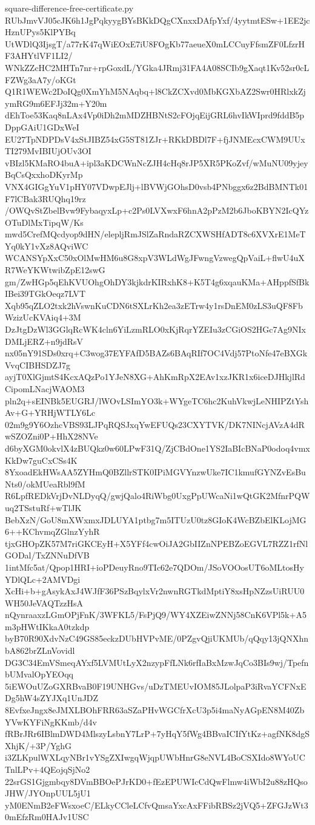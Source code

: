 \documentclass[11pt]{article}
\theoremstyle{definition}
\theoremstyle{remark}
\begin{document}
\begin{filecontents*}[overwrite]{square-difference-free-certificate.py}
RUbJmvVJ05cJK6h1JgPqkyygBYsBKkDQgCXnxxDAfpYxf/4yytmtESw+1EE2jcHznUPys5KlPYBq
UtWDlQ3IjsgT/a77rK47qWiEOxE7iU8FOgKb77aeueX0mLCCuyFfsmZF0LfzrHF3AHYtlVF1LI2/
WNkZZcHC2MHTn7nr+rpGoxdL/YGka4JRmj31FA4A08SCIb9gXaqt1Kv52sr0cLFZWg3aA7y/oKGt
Q1R1WEWc2DoIQg0XmYhM5NAqbq+l8CkZCXvd0MbKGXbAZ2Swr0HRlxkZjymRG9m6EFJj32m+Y20m
dEhToe53Kaq8nLAx4Vp0iDh2mMDZHBNtS2cFOjqEijGRL6hvIkWIprd9fddB5pDppGAiU1GDxWeI
EU27TpNDPDsV4xStJIBZ54xG5ST81ZJr+RKkDBDl7F+fjJNMEcxCWM9UUxTI279MvIBIUjOUv3OI
vBIzl5KMaRO4buA+ipl3aKDCWnNcZJH4cHq8rJP5XR5PKoZvf/wMuNU09yjeyBqCsQxxhoDKyrMp
VNX4GIGgYuV1pHY07VDwpEJlj+lBVWjGOhsD0vsb4PNbggx6z2BdBMNTk01F7lCBak3RUQhq19rz
/OWQvStZbelBvw9FybaqyxLp+c2Ps0LVXwxF6hnA2pPzM2b6JboKBYN2IcQYzOTuDlMxTipqW/Ks
mwd5CrefMQcdyop9dHN/elepljRmJSlZaRndaRZCXWSHfADT8c6XVXrE1MeTYq0kY1vXz8AQviWC
WCANSYpXxC50xOlMwHM6u8G8xpV3WLdWgJFwngVzwegQpVaiL+flwU4uXR7WeYKWtwibZpE12swG
gm/ZwHGp5qEhKVUOhgOhDY3kjkdrKIRxhK8+K5T4g6xqauKMa+AHppfSfBkIBei39TGkOeqz7LVT
Xqb95qZLO2txk2hVswnKuCDN6tSXLrKh2ea3zETrw4y1rsDnEM0zLS3uQF8FbWzizUcKVAiq4+3M
DzJtgDzWl3GGlqRcWK4cln6YiLzmRLO0xKjRqrYZEIu3zCGiOS2HGc7Ag9NIxDMLjERZ+n9jdRsV
nx05nY91SDs0xrq+C3wog37EYFAfD5BAZs6BAqRIf7OC4Vdj57PtoNfe47eBXGkVvqCIBHSDZJ7g
ayjT0XlGjmtS4KcxAQzPo1YJeN8XG+AhKmRpX2EAv1xzJKR1x6iceDJHkjlRdCipomLNacjWAOM3
pln2q+sEINBk5EUGRJ/lWOvLSImYO3k+WYgeTC6hc2KuhVkwjLeNHIPZtYshAv+G+YRHjWTLY6Lc
02m9g9Y6OzhcVBS93LJPqRQSJxqYwEFUQs23CXYTVK/DK7NINcjAVzA4dRwSZOZni0P+HhX28NVe
d6byXGM0okvlX4zBUQkz0w60LPwF31Q/ZjCBdOne1YS2IaBIcBNaP0odoq4vmxKkDw7guCxCSs4K
8YxoadEkHWsAA5ZYHmQ0BZllrSTK0IPiMGVYnzwUke7IC1kmufGYNZvEsBuNts0/okMUeaRbl9fM
R6LpfREDkVrjDvNLDyqQ/gwjQalo4RiWbg0UxgPpUWcaNi1wQtGK2MfnrPQWuq2TSstuRf+wTlJK
BebXzN/GoU8mXWxmxJDLUYA1ptbg7m5ITUzU0tz8GIoK4WcBZbElKLojMG6++KChvmqZGlnzYyhR
tjxGHOpZK57M7riGKCEyH+X5YFf4cwOiJA2GbIIZnNPEBZoEGVL7RZZ1rfNlGODal/TxZNNuDfVB
1intMfc5at/Qpop1HRI+ioPDeuyRno9TIc62e7QDOm/JSoVOOosUT6oMLtosHyYDlQLc+2AMVDgi
XcHi+b+gAsykAxJ4WJfF36PSzBqylxVr2nwnRGTkdMptiY8xsHpNZzsUiRUU0WH50JeVAQTzzHsA
nQynraaxzLGmOPjFnK/3WFKL5/FsPjQ9/WY4XZEiwZNNj58CnK6VPl5k+A5m3pHWtIKkaA0tzkdp
byB70R90XdvNzC49GS85eckzDUbHVPvME/0PZgvQjiUKMUb/qQqy13jQNXhnbA862brZLnVovidl
DG3C34EmVSmeqAYxf5LVMUtLyX2nzypFfLNk6rfIaBxMzwJqCo3BIs9wj/TpefnbUMvalOpYEOqq
5iEWOuUZoGXRBvaB0F19UNHGvs/uDzTMEUvIOM85JLolpaP3iRvaYCFNxEDg5hW4sZYJXq1UnJDZ
8EvfxeJngx8eJMXLBOhFRR63aSZaPHvWGCfrXcU3p5i4maNyAGpEN8M40ZbYVwKYFiNgKKmb/d4v
fRBrJRr6IBlmDWD4MlszyLsbnY7LrP+7yHqY5fWg4BBvaICIfYtKz+agfNK8dgSXhjK/+3P/YghG
i3ZLKpulWXLqyNBr1vYSgZXIwgqWjqpUWbHnrG8eNVL4BoCSXIdo8WYoUCTnlLPv+4QEojqSjNo2
22srGS1Gjgmbqy8DVmBBOePJrKD0+fEzEPUWIcCdQwFlmw4iWbI2u88zHQsoJHW/JYOnpUUL5jU1
yM0ENmB2eFWsxoeC/ELkyCCleLCfvQmsaYxcAxFFibRBSz2jVQ5+ZFGJzWt30mEfzRm0HAJv1USC

\end{filecontents*}
\end{document}
